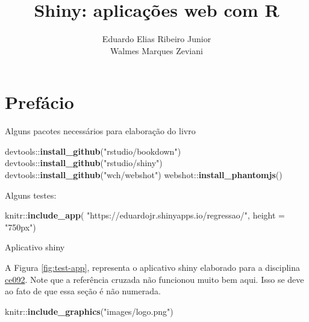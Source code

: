 \documentclass[]{book}
\title{Shiny: aplicações web com R}
\author{Eduardo Elias Ribeiro Junior \\ Walmes Marques Zeviani}
\date{}
\newenvironment{Shaded}{\begin{snugshade}}{\end{snugshade}}
\newcommand{\KeywordTok}[1]{\textcolor[rgb]{0.13,0.29,0.53}{\textbf{{#1}}}}
\newcommand{\DataTypeTok}[1]{\textcolor[rgb]{0.13,0.29,0.53}{{#1}}}
\newcommand{\StringTok}[1]{\textcolor[rgb]{0.31,0.60,0.02}{{#1}}}
\newcommand{\NormalTok}[1]{{#1}}
\begin{document}
\maketitle

{
\setcounter{tocdepth}{1}
\tableofcontents
}
\chapter*{Prefácio}\label{prefacio}

Alguns pacotes necessários para elaboração do livro

\begin{Shaded}
\begin{Highlighting}[]
\NormalTok{devtools::}\KeywordTok{install_github}\NormalTok{(}\StringTok{"rstudio/bookdown"}\NormalTok{)}
\NormalTok{devtools::}\KeywordTok{install_github}\NormalTok{(}\StringTok{"rstudio/shiny"}\NormalTok{)}
\NormalTok{devtools::}\KeywordTok{install_github}\NormalTok{(}\StringTok{"wch/webshot"}\NormalTok{)}
\NormalTok{webshot::}\KeywordTok{install_phantomjs}\NormalTok{()}
\end{Highlighting}
\end{Shaded}

Alguns testes:

\begin{Shaded}
\begin{Highlighting}[]
\NormalTok{knitr::}\KeywordTok{include_app}\NormalTok{(}
    \StringTok{"https://eduardojr.shinyapps.io/regressao/"}\NormalTok{,}
    \DataTypeTok{height =} \StringTok{"750px"}\NormalTok{)}
\end{Highlighting}
\end{Shaded}

\label{fig:test-app}Aplicativo shiny

A Figura \ref{fig:test-app}, representa o aplicativo shiny elaborado
para a disciplina
\href{http://www.leg.ufpr.br/doku.php/disciplinas:ce092-2015-02}{ce092}.
Note que a referência cruzada não funcionou muito bem aqui. Isso se deve
ao fato de que essa seção é não numerada.

\begin{Shaded}
\begin{Highlighting}[]
\NormalTok{knitr::}\KeywordTok{include_graphics}\NormalTok{(}\StringTok{"images/logo.png"}\NormalTok{)}
\end{Highlighting}
\end{Shaded}
\end{document}
